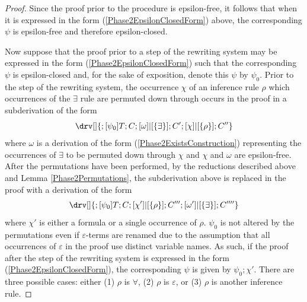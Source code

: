 \documentclass[10pt]{article}
\theoremstyle{definition}\newtheorem{remark}[theorem]{Remark}
\theoremstyle{definition}\newtheorem{example}[theorem]{Example}
\theoremstyle{definition}\newtheorem{definition}[theorem]{Definition}
\newcommand{\falsifierRule}{{\mathsf{\varepsilon}}}
\newcommand{\seqComp}{;}
\begin{document}
\begin{proof}
		Since the proof prior to the procedure is epsilon-free, it follows that when it is expressed in the form (\ref{Phase2EpsilonClosedForm}) above, the corresponding $\psi$ is epsilon-free and therefore epsilon-closed.
		
		Now suppose that the proof prior to a step of the rewriting system may be expressed in the form (\ref{Phase2EpsilonClosedForm}) such that the corresponding $\psi$ is epsilon-closed and, for the sake of exposition, denote this $\psi$ by $\psi_0$. Prior to the step of the rewriting system, the occurrence $\chi$ of an inference rule $\rho$ which occurrences of the $\exists$ rule are permuted down through occurs in the proof in a subderivation of the form
		\[
		\drv[] {
			; [\psi_0]T ; C ; [\omega]|[\{\exists\}] ; C' ; [\chi]|[\{\rho\}] ; C''
		}
		\]
		where $\omega$ is a derivation of the form (\ref{Phase2ExistsConstruction}) representing the occurrences of $\exists$ to be permuted down through $\chi$ and $\chi$ and $\omega$ are epsilon-free. After the permutations have been performed, by the reductions described above and Lemma \ref{Phase2Permutations}, the subderivation above is replaced in the proof with a derivation of the form
		\[
			\drv[] {
				; [\psi_0]T ; C ; [\chi']|[\{\rho\}] ; C''' ; [\omega']|[\{\exists\}] ; C''''
			}
		\]
		where $\chi'$ is either a formula or a single occurrence of $\rho$. $\psi_0$ is not altered by the permutations even if $\varepsilon$-terms are renamed due to the assumption that all occurrences of $\falsifierRule$ in the proof use distinct variable names. As such, if the proof after the step of the rewriting system is expressed in the form (\ref{Phase2EpsilonClosedForm}), the corresponding $\psi$ is given by $\psi_0 \seqComp \chi'$. There are three possible cases: either (1) $\rho$ is $\forall$, (2) $\rho$ is $\falsifierRule$, or (3) $\rho$ is another inference rule.
		

\end{proof}
\end{document}
